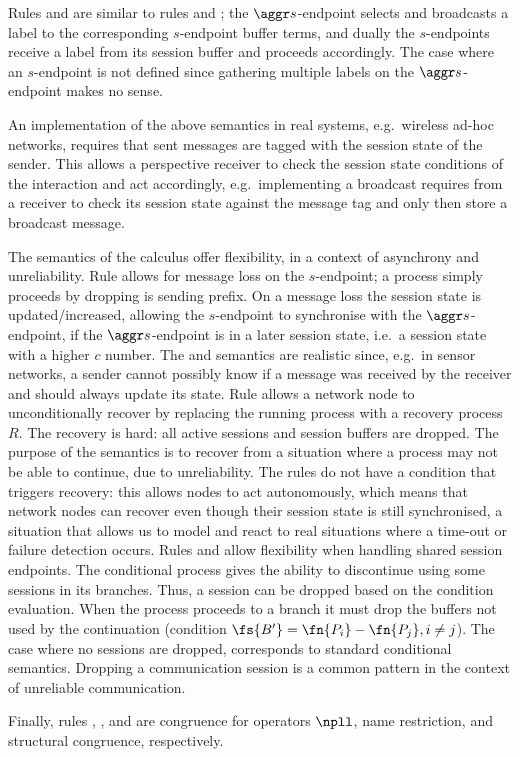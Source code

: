 Rules \Select and \Branch are similar to rules \Broadcast and \Receive;
the $\aggr s$-endpoint selects and broadcasts a label to the corresponding
$s$-endpoint buffer terms, and dually the $s$-endpoints receive a label
from its session buffer and proceeds accordingly.
%
The case where an $s$-endpoint is not defined since gathering multiple
labels on the $\aggr s$-endpoint makes no sense.

An implementation of the above semantics in real systems,
e.g.~wireless ad-hoc networks, requires that sent messages are
tagged with the session state of the sender.
This allows a perspective receiver to check the session state
conditions of the interaction and act accordingly,
e.g.~implementing a broadcast requires from a receiver to check its
session state against the message tag and only then store a broadcast message.

The semantics of the calculus offer flexibility, in a context
of asynchrony and unreliability.
%
Rule \Loss allows for message loss on the $s$-endpoint;
a process simply proceeds by dropping is sending prefix.
%
On a message loss the session state is updated/increased, allowing the $s$-endpoint
to synchronise with the $\aggr s$-endpoint, if the $\aggr s$-endpoint is
in a later session state, i.e.~a session state with a higher $c$ number.
%
The \Loss and \Unicast semantics are realistic since, e.g.~in sensor
networks, a sender cannot possibly know if a message was received by the
receiver and should always update its state.
%
Rule \Recover allows a network node to unconditionally recover
by replacing the running process with a recovery process $R$.
The recovery is hard: all active sessions and session buffers are dropped.
The purpose of the semantics is to recover from a situation where a process
may not be able to continue, due to unreliability.
The rules do not have a condition that triggers recovery:
this allows nodes to act autonomously, which means that
network nodes can recover even though their session state is still
synchronised, a situation that allows us to
model and react to real situations where a time-out
or failure detection occurs.
%
Rules \True and \False allow flexibility when handling shared session endpoints.
The conditional process gives the ability to discontinue using some
sessions in its branches. Thus, a session can be dropped based on the
condition evaluation.
%
When the process proceeds to a branch it must drop the buffers not used
by the continuation (condition $\fs{B'} = \fn{P_i} - \fn{P_j}, i \not= j$).
The case where no sessions are dropped, corresponds to standard conditional
semantics.
Dropping a communication session
is a common pattern in the context of
unreliable communication.

Finally, rules \RPar, \RRes, and \RCong are congruence for operators
$\npll$, name restriction, and structural congruence, respectively.
